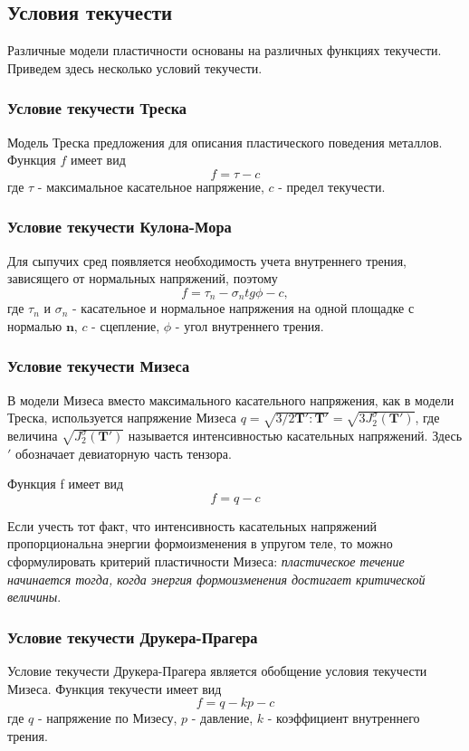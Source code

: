 \documentclass[12pt,a4paper, titlepage, openany]{book}
\begin{document}
\subsection{Условия текучести}
Различные модели пластичности основаны на различных функциях текучести. Приведем здесь несколько условий текучести.
\subsubsection{Условие текучести Треска}
Модель Треска предложения для описания пластического поведения металлов. Функция $f$ имеет вид
\begin{equation}
f = \tau - c
\end{equation}
где $\tau$ - максимальное касательное напряжение, $c$ - предел текучести.
\subsubsection{Условие текучести Кулона-Мора}
Для сыпучих сред появляется необходимость учета внутреннего трения, зависящего от нормальных напряжений, поэтому 
\begin{equation}
f = \tau_n - \sigma_n tg \phi - c,
\end{equation}
где $\tau_n$ и $\sigma_n$ - касательное и нормальное напряжения на одной площадке с нормалью $\mathbf{n}$, $c$ - сцепление, $\phi$ - угол внутреннего трения.
\subsubsection{Условие текучести Мизеса}
В модели Мизеса вместо максимального касательного напряжения, как в модели Треска, используется напряжение Мизеса $q = \sqrt{3/2 \mathbf{T'}:\mathbf{T'}} = \sqrt{3 J^{\sigma}_2 (\mathbf{T'})}$, где величина $\sqrt{J^{\sigma}_2 (\mathbf{T'})}$ называется интенсивностью касательных напряжений. Здесь $'$ обозначает девиаторную часть тензора.
\par
Функция f имеет вид
\begin{equation}
f = q - c
\end{equation}
\par
Если учесть тот факт, что интенсивность касательных напряжений пропорциональна энергии формоизменения в упругом теле, то можно сформулировать критерий пластичности Мизеса: \textit{пластическое течение начинается тогда, когда энергия формоизменения достигает критической величины}.
\subsubsection{Условие текучести Друкера-Прагера}
Условие текучести Друкера-Прагера является обобщение условия текучести Мизеса. Функция текучести имеет вид
\begin{equation}
f = q - kp - c
\end{equation}
где $q$ - напряжение по Мизесу, $p$ - давление, $k$ - коэффициент внутреннего трения.
\end{document}

